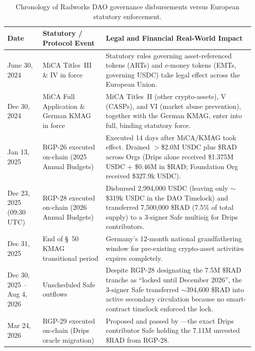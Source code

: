 \documentclass[a4paper,11pt,twoside,parskip=half-,headings=small]{scrartcl}
\begin{document}
\begin{table}[H]
\centering\small
\renewcommand{\arraystretch}{1.12}
\begin{tabularx}{\textwidth}{@{}L{2.8cm}L{3.5cm}Y@{}}
\toprule
\textbf{Date} & \textbf{Statutory / Protocol Event} & \textbf{Legal and Financial Real-World Impact} \\
\midrule
June 30, 2024 & MiCA Titles~III \& IV in force & Statutory rules governing asset-referenced tokens (ARTs) and e-money tokens (EMTs, governing USDC) take legal effect across the European Union. \\
Dec 30, 2024 & MiCA Full Application \& German KMAG in force & MiCA Titles~II (other crypto-assets), V (CASPs), and VI (market abuse prevention), together with the German KMAG, enter into full, binding statutory force. \\
Jan 13, 2025 & RGP-26 executed on-chain (2025 Annual Budgets) & Executed 14 days after MiCA/KMAG took effect. Drained $>$\$2.0M USDC plus \$RAD across Orgs (Drips alone received \$1.375M USDC + \$0.46M in \$RAD; Foundation Org received \$327.9k USDC). \\
Dec 23, 2025 (09:30 UTC) & RGP-28 executed on-chain (2026 Annual Budgets) & Disbursed 2,994,000 USDC (leaving only $\sim$\$319k USDC in the DAO Timelock) and transferred 7,500,000 \$RAD (7.5\% of total supply) to a 3-signer Safe multisig for Drips contributors. \\
Dec 31, 2025 & End of \S~50 KMAG transitional period & Germany's 12-month national grandfathering window for pre-existing crypto-asset activities expires completely. \\
Dec 30, 2025 -- Aug 4, 2026 & Unscheduled Safe outflows & Despite RGP-28 designating the 7.5M \$RAD tranche as ``locked until December 2026'', the 3-signer Safe transferred $\sim$394,600 \$RAD into active secondary circulation because no smart-contract timelock enforced the lock. \\
Mar 24, 2026 & RGP-29 executed on-chain (Drips oracle migration) & Proposed and passed by ---the exact Drips contributor Safe holding the 7.11M unvested \$RAD from RGP-28. \\
\bottomrule
\end{tabularx}
\caption{Chronology of Radworks DAO governance disbursements versus European statutory enforcement.}
\label{tab:radworks_outflow_timeline}
\end{table}
\end{document}
